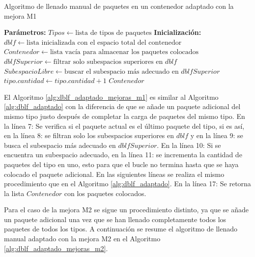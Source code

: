 \documentclass[openany]{article}
\begin{document}
\begin{algorithm}[H]
    \caption{Algoritmo de llenado manual de paquetes en un contenedor adaptado con la mejora M1}
    \label{alg:dblf_adaptado_mejoras_m1}
    \begin{algorithmic}[1]
        \State \textbf{Parámetros:} $Tipos \gets \text{lista de tipos de paquetes}$
        \State \textbf{Inicialización:} $dblf \gets \text{lista inicializada con el espacio total del contenedor}$
        \State $Contenedor \gets \text{lista vacía para almacenar los paquetes colocados}$
        \State {} 
        \State $dblfSuperior \gets \text{filtrar solo subespacios superiores en } dblf$
        \State $SubespacioLibre \gets \text{buscar el subespacio más adecuado en } dblfSuperior$
        \State $tipo.cantidad \gets tipo.cantidad + 1$
        \EndIf
        \EndIf
        \EndFor
        \State {} 
        \EndFor
        \State \Return $Contenedor$
    \end{algorithmic}
\end{algorithm}

El Algoritmo \ref{alg:dblf_adaptado_mejoras_m1} es similar al Algoritmo \ref{alg:dblf_adaptado} con la diferencia de que se añade un paquete adicional del mismo tipo justo después de completar la carga de paquetes del mismo tipo. En la línea 7: Se verifica si el paquete actual es el último paquete del tipo, si es así, en la línea 8: se filtran solo los subespacios superiores en $dblf$ y en la línea 9: se busca el subespacio más adecuado en $dblfSuperior$. En la línea 10: Si se encuentra un subespacio adecuado, en la línea 11: se incrementa la cantidad de paquetes del tipo en uno, esto para que el bucle no termina hasta que se haya colocado el paquete adicional. En las siguientes líneas se realiza el mismo procedimiento que en el Algoritmo \ref{alg:dblf_adaptado}. En la línea 17: Se retorna la lista $Contenedor$ con los paquetes colocados.

Para el caso de la mejora M2 se sigue un procedimiento distinto, ya que se añade un paquete adicional una vez que se han llenado completamente todos los paquetes de todos los tipos. A continuación se resume el algoritmo de llenado manual adaptado con la mejora M2 en el Algoritmo \ref{alg:dblf_adaptado_mejoras_m2}.
\end{document}

